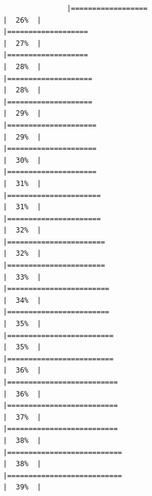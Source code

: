 \documentclass[
]{article}
\begin{document}
\begin{verbatim}
               |==================                                                    |  26%  |                                                                              |===================                                                   |  27%  |                                                                              |===================                                                   |  28%  |                                                                              |====================                                                  |  28%  |                                                                              |====================                                                  |  29%  |                                                                              |=====================                                                 |  29%  |                                                                              |=====================                                                 |  30%  |                                                                              |=====================                                                 |  31%  |                                                                              |======================                                                |  31%  |                                                                              |======================                                                |  32%  |                                                                              |=======================                                               |  32%  |                                                                              |=======================                                               |  33%  |                                                                              |========================                                              |  34%  |                                                                              |========================                                              |  35%  |                                                                              |=========================                                             |  35%  |                                                                              |=========================                                             |  36%  |                                                                              |==========================                                            |  36%  |                                                                              |==========================                                            |  37%  |                                                                              |==========================                                            |  38%  |                                                                              |===========================                                           |  38%  |                                                                              |===========================                                           |  39%  |                                                                
\end{verbatim}
\end{document}
